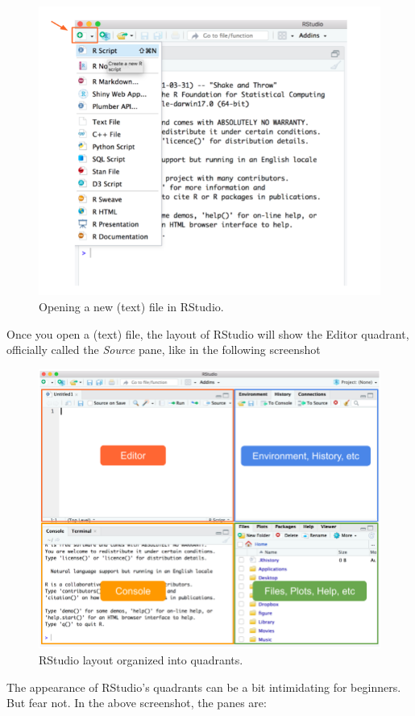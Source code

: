 \documentclass[
]{book}
\begin{document}
\begin{figure}

{\centering \includegraphics[width=0.6\linewidth]{images/rstudio/rstudio-new-file} 

}

\caption{Opening a new (text) file in RStudio.}\label{fig:unnamed-chunk-25}
\end{figure}

Once you open a (text) file, the layout of RStudio will show the Editor
quadrant, officially called the \emph{Source} pane, like in the following screenshot

\begin{figure}

{\centering \includegraphics[width=0.8\linewidth]{images/rstudio/rstudio-quadrants} 

}

\caption{RStudio layout organized into quadrants.}\label{fig:unnamed-chunk-26}
\end{figure}

The appearance of RStudio's quadrants can be a bit intimidating for beginners.
But fear not. In the above screenshot, the panes are:
\end{document}
